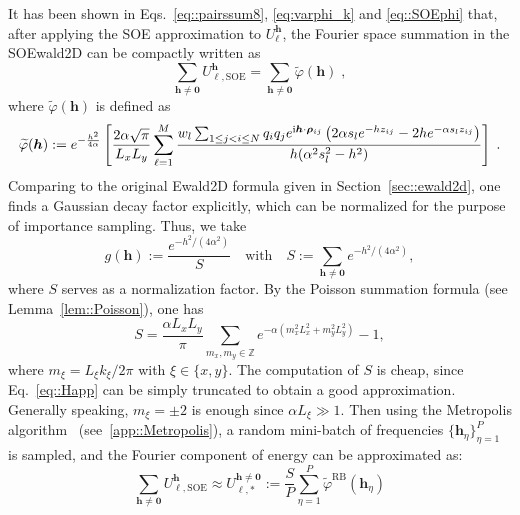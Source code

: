 
It has been shown in Eqs.~\eqref{eq::pairssum8}, \eqref{eq:varphi_k} and \eqref{eq::SOEphi} that, after applying the SOE approximation to $U_{\ell}^{\bm{h}}$, the Fourier space summation in the SOEwald2D can be compactly written as
\begin{equation}
	\sum_{\bm{h}\neq\bm{0}} U_{\ell,\text{SOE}}^{\bm{h}} = \sum_{\bm{h}\neq\bm{0}} \widetilde{\varphi} (\bm{h})\;,
\end{equation}
where $\widetilde{\varphi} ({\bm{h}})$ is defined as
\begin{equation}
	\widetilde{\varphi} ({\bm{h}}) := e^{-\frac{h^2}{4 \alpha}} \left[ \frac{2\alpha\sqrt{\pi}}{L_xL_y}\sum_{\ell = 1}^{M}  \frac{w_l \sum_{1\leq j < i \leq N}q_{i} q_{j} e^{\mathrm{i}\boldsymbol{h} \cdot \boldsymbol{\rho}_{ij}} \left(2\alpha s_l e^{-h z_{ij}}-2h e^{-\alpha s_l z_{ij}}\right) }{h(\alpha^2 s_l^2 - h^2)} \right] \;.
\end{equation}
Comparing to the original Ewald2D formula given in Section~\ref{sec::ewald2d}, one finds a Gaussian decay factor explicitly, which can be normalized for the purpose of importance sampling.
Thus, we take
\begin{equation}\label{eq::hk}
	g(\bm{h}) := \frac{e^{-h^2/(4\alpha^2)}}{S}\quad\text{with}\quad S := \sum_{\bm{h}\neq\bm{0}}e^{-h^2/(4\alpha^2)},
\end{equation}
where $S$ serves as a normalization factor. 
By the Poisson summation formula (see Lemma~\ref{lem::Poisson}), one has 
\begin{equation}\label{eq::Happ}
	S=\frac{\alpha L_xL_y}{\pi}\sum_{m_x,m_y\in\mathbb{Z}}e^{-\alpha(m_x^2L_x^2+m_y^2L_y^2)}-1,
\end{equation}
where $m_{\xi}=L_{\xi}k_{\xi}/2\pi$ with $\xi\in\{x,y\}$. 
The computation of $S$ is cheap, since Eq.~\eqref{eq::Happ} can be simply truncated to obtain a good approximation. 
Generally speaking, $m_{\xi}=\pm 2$ is enough since $\alpha L_{\xi}\gg 1$.
Then using the Metropolis algorithm~\cite{metropolis1953equation, hastings1970monte} (see~\ref{app::Metropolis}), a random mini-batch of frequencies $\{\bm{h}_{\eta}\}_{\eta=1}^P$ is sampled, and the Fourier component of energy can be approximated as:
\begin{equation}\label{eq::RBapp}
	\sum_{\bm{h}\neq\bm{0}} U_{\ell,\text{SOE}}^{\bm{h}} \approx U_{\ell,*}^{\bm{h}\neq\bm{0}} := \frac{S}{P}\sum_{\eta=1}^{P}\widetilde{\varphi}^{\text{RB}}(\bm{h}_{\eta})
\end{equation}
